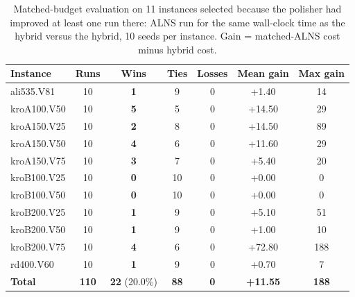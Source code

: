 \begin{table}[t]
\centering
\caption{Matched-budget evaluation on 11 instances selected because the polisher had improved at least one run there: ALNS run for the same wall-clock time as the hybrid versus the hybrid, 10 seeds per instance. Gain = matched-ALNS cost minus hybrid cost.}
\label{tab:matched_budget}
\footnotesize\setlength{\tabcolsep}{4pt}
\begin{tabular}{l ccc cc c}
\toprule
\textbf{Instance} & \textbf{Runs} & \textbf{Wins} & \textbf{Ties} & \textbf{Losses} & \textbf{Mean gain} & \textbf{Max gain} \\
\midrule
ali535.V81 & 10 & \textbf{1} & 9 & 0 & +1.40 & 14 \\
kroA100.V50 & 10 & \textbf{5} & 5 & 0 & +14.50 & 29 \\
kroA150.V25 & 10 & \textbf{2} & 8 & 0 & +14.50 & 89 \\
kroA150.V50 & 10 & \textbf{4} & 6 & 0 & +11.60 & 29 \\
kroA150.V75 & 10 & \textbf{3} & 7 & 0 & +5.40 & 20 \\
kroB100.V25 & 10 & \textbf{0} & 10 & 0 & +0.00 & 0 \\
kroB100.V50 & 10 & \textbf{0} & 10 & 0 & +0.00 & 0 \\
kroB200.V25 & 10 & \textbf{1} & 9 & 0 & +5.10 & 51 \\
kroB200.V50 & 10 & \textbf{1} & 9 & 0 & +1.00 & 10 \\
kroB200.V75 & 10 & \textbf{4} & 6 & 0 & +72.80 & 188 \\
rd400.V60 & 10 & \textbf{1} & 9 & 0 & +0.70 & 7 \\
\midrule
\textbf{Total} & \textbf{110} & \textbf{22} (20.0\%) & \textbf{88} & \textbf{0} & \textbf{+11.55} & \textbf{188} \\
\bottomrule
\end{tabular}
\end{table}
